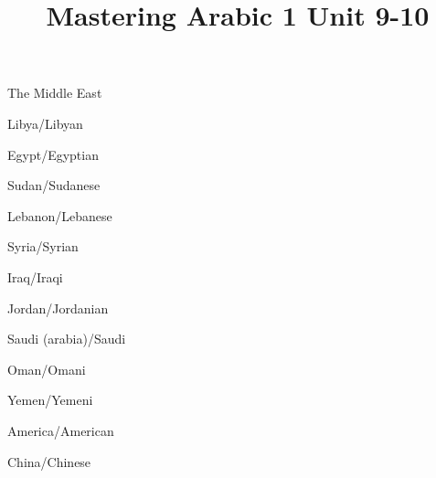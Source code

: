 \documentclass[avery5371,grid,frame]{flashcards}
\title{Mastering Arabic 1 Unit 9-10}
\begin{document}
\begin{flashcard}{\LARGE The Middle East}
\LARGE {}
\end{flashcard}
\begin{flashcard}{\LARGE Libya/Libyan}
\LARGE {}
\end{flashcard}
\begin{flashcard}{\LARGE Egypt/Egyptian}
\LARGE {}
\end{flashcard}
\begin{flashcard}{\LARGE Sudan/Sudanese}
\LARGE {}
\end{flashcard}
\begin{flashcard}{\LARGE Lebanon/Lebanese}
\LARGE {}
\end{flashcard}
\begin{flashcard}{\LARGE Syria/Syrian}
\LARGE {}
\end{flashcard}
\begin{flashcard}{\LARGE Iraq/Iraqi}
\LARGE {}
\end{flashcard}
\begin{flashcard}{\LARGE Jordan/Jordanian}
\LARGE {}
\end{flashcard}
\begin{flashcard}{\LARGE Saudi (arabia)/Saudi}
\LARGE {}
\end{flashcard}
\begin{flashcard}{\LARGE Oman/Omani}
\LARGE {}
\end{flashcard}
\begin{flashcard}{\LARGE Yemen/Yemeni}
\LARGE {}
\end{flashcard}
\begin{flashcard}{\LARGE America/American}
\LARGE {}
\end{flashcard}
\begin{flashcard}{\LARGE China/Chinese}
\LARGE {}
\end{flashcard}
\end{document}
